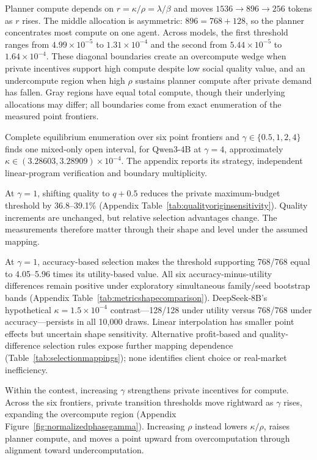 \documentclass{article}
\begin{document}
Planner compute depends on $r=\kappa/\rho=\lambda/\beta$ and moves $1536\to896\to256$ tokens as $r$ rises. The middle allocation is asymmetric: $896=768+128$, so the planner concentrates most compute on one agent. Across models, the first threshold ranges from $4.99\times10^{-5}$ to $1.31\times10^{-4}$ and the second from $5.44\times10^{-5}$ to $1.64\times10^{-4}$. These diagonal boundaries create an overcompute wedge when private incentives support high compute despite low social quality value, and an undercompute region when high $\rho$ sustains planner compute after private demand has fallen. Gray regions have equal total compute, though their underlying allocations may differ; all boundaries come from exact enumeration of the measured point frontiers.

Complete equilibrium enumeration over six point frontiers and $\gamma\in\{0.5,1,2,4\}$ finds one mixed-only open interval, for Qwen3-4B at $\gamma=4$, approximately $\kappa\in(3.28603,3.28909)\times10^{-4}$. The appendix reports its strategy, independent linear-program verification and boundary multiplicity.

At $\gamma=1$, shifting quality to $q+0.5$ reduces the private maximum-budget threshold by 36.8--39.1\% (Appendix Table~\ref{tab:qualityoriginsensitivity}). Quality increments are unchanged, but relative selection advantages change. The measurements therefore matter through their shape and level under the assumed mapping.

At $\gamma=1$, accuracy-based selection makes the threshold supporting 768/768 equal to 4.05--5.96 times its utility-based value. All six accuracy-minus-utility differences remain positive under exploratory simultaneous family/seed bootstrap bands (Appendix Table~\ref{tab:metricshapecomparison}). DeepSeek-8B's hypothetical $\kappa=1.5\times10^{-4}$ contrast---128/128 under utility versus 768/768 under accuracy---persists in all 10,000 draws. Linear interpolation has smaller point effects but uncertain shape sensitivity. Alternative profit-based and quality-difference selection rules expose further mapping dependence (Table~\ref{tab:selectionmappings}); none identifies client choice or real-market inefficiency.

Within the contest, increasing $\gamma$ strengthens private incentives for compute. Across the six frontiers, private transition thresholds move rightward as $\gamma$ rises, expanding the overcompute region (Appendix Figure~\ref{fig:normalizedphasegamma}). Increasing $\rho$ instead lowers $\kappa/\rho$, raises planner compute, and moves a point upward from overcomputation through alignment toward undercomputation.
\end{document}
